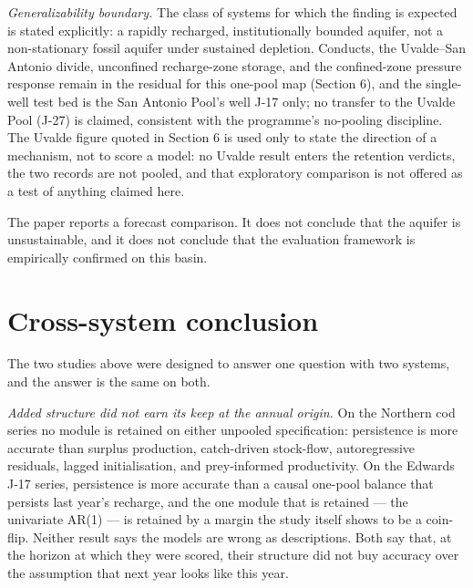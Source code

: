 \documentclass[11pt]{article}
\begin{document}
\emph{Generalizability boundary.} The class of systems for which the
finding is expected is stated explicitly: a rapidly recharged,
institutionally bounded aquifer, not a non-stationary fossil aquifer
under sustained depletion. Conducts, the Uvalde--San Antonio divide,
unconfined recharge-zone storage, and the confined-zone pressure
response remain in the residual for this one-pool map (Section 6), and
the single-well test bed is the San Antonio Pool's well J-17 only; no
transfer to the Uvalde Pool (J-27) is claimed, consistent with the
programme's no-pooling discipline. The Uvalde figure quoted in Section 6
is used only to state the direction of a mechanism, not to score a
model: no Uvalde result enters the retention verdicts, the two records
are not pooled, and that exploratory comparison is not offered as a test
of anything claimed here.

The paper reports a forecast comparison. It does not conclude that the
aquifer is unsustainable, and it does not conclude that the evaluation
framework is empirically confirmed on this basin.

\section{Cross-system conclusion}
\label{conclusion}

The two studies above were designed to answer one question with two systems, and the answer is the
same on both.

\emph{Added structure did not earn its keep at the annual origin.} On the Northern cod series no
module is retained on either unpooled specification: persistence is more accurate than surplus
production, catch-driven stock-flow, autoregressive residuals, lagged initialisation, and
prey-informed productivity. On the Edwards J-17 series, persistence is more accurate than a causal
one-pool balance that persists last year's recharge, and the one module that is retained --- the
univariate AR(1) --- is retained by a margin the study itself shows to be a coin-flip. Neither
result says the models are wrong as descriptions. Both say that, at the horizon at which they were
scored, their structure did not buy accuracy over the assumption that next year looks like this
year.
\end{document}

